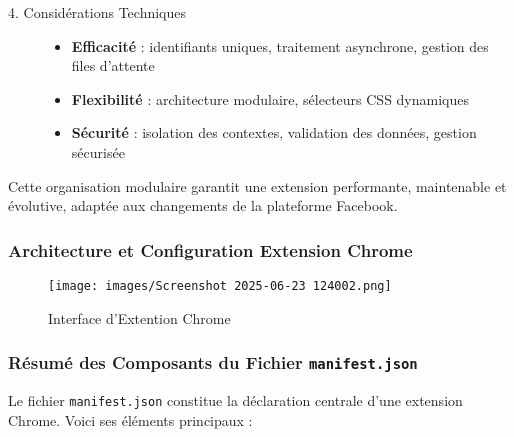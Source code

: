 \begin{description}
    \item[4. Considérations Techniques]
    \begin{itemize}
        \item \textbf{Efficacité} : identifiants uniques, traitement asynchrone, gestion des files d’attente
        \item \textbf{Flexibilité} : architecture modulaire, sélecteurs CSS dynamiques
        \item \textbf{Sécurité} : isolation des contextes, validation des données, gestion sécurisée
    \end{itemize}
\end{description}

\vspace{0.3cm}
Cette organisation modulaire garantit une extension performante, maintenable et évolutive, adaptée aux changements de la plateforme Facebook.


\newline
\begin{description}

\subsubsection{Architecture et Configuration Extension Chrome}
 \begin{figure}[ht!]
    \centering
    \texttt{[image: images/Screenshot 2025-06-23 124002.png]}
    \caption{Interface d'Extention Chrome}
    \label{fig:enter-label}
    \end{figure}
    
\end{description}
\hspace{-1cm}
\subsubsection*{Résumé des Composants du Fichier \texttt{manifest.json}}

Le fichier \texttt{manifest.json} constitue la déclaration centrale d'une extension Chrome. Voici ses éléments principaux :

